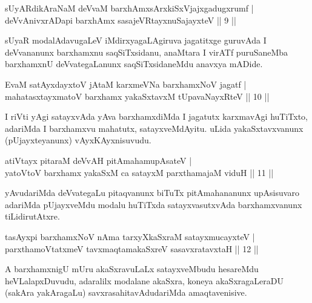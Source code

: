 
\begin{shl}
sUyARdikAraNaM deVvaM barxhAmx\s sArxkiSxVjajxgadugxrumf | \\
deVvAnivxrADapi barxhAmx sasajeVRtayxnuSajayxteV \hfill ||  9 || 
\end{shl}

\begin{artha}
sUyaR modalAdavugaLeV iMdirxyagaLAgiruva jagatitxge guruvAda I deVvananunx barxhamxnu saqSiTxsidanu, anaMtara I virATf puruSaneMba barxhamxnU deVvategaLanunx saqSiTxsidaneMdu anavxya mADide.
\end{artha}

\begin{shl}
EvaM satAyxdayxtoV jAtaM karxmeVNa barxhamxNoV jagatf | \\
mahatasxtayxmatoV barxhamx yakaSxtavxM tUpavaNayxRteV \hfill ||  10 || 
\end{shl}

\begin{artha}
I riVti yAgi satayxvAda yAva barxhamxdiMda I jagatutx karxmavAgi huTiTxto, adariMda I barxhamxvu mahatutx, satayxveMdAyitu. uLida yakaSxtavxvanunx (pUjayxteyanunx) vAyxKAyxnisuvudu.
\end{artha}

\begin{shl}
atiVtayx pitaraM deVvAH pitAmahamupAsateV | \\
yatoV\s toV barxhamx yakaSxM ca satayxM parxthamajaM viduH \hfill ||  11 || 
\end{shl}

\begin{artha}
yAvudariMda deVvategaLu pitaqvanunx biTuTx pitAmahananunx upAsisuvaro adariMda pUjayxveMdu modalu huTiTxda satayxvasutxvAda barxhamxvanunx tiLidirutAtxre.
\end{artha}


\begin{shl}
tasAyxpi barxhamxNoV nAma tarxyXkaSxraM satayxmucayxteV | \\
parxthamoVtatxmeV tavxmaqtamakaSxreV sasavxratavxtaH \hfill ||  12 || 
\end{shl}

\begin{artha}
A barxhamxnigU mUru akaSxravuLaLx satayxveMbudu hesareMdu heVLalapxDuvudu, adaralilx modalane akaSxra, koneya akaSxragaLeraDU (sakAra yakAragaLu) savxrasahitavAdudariMda amaqtavenisive.
\end{artha}

